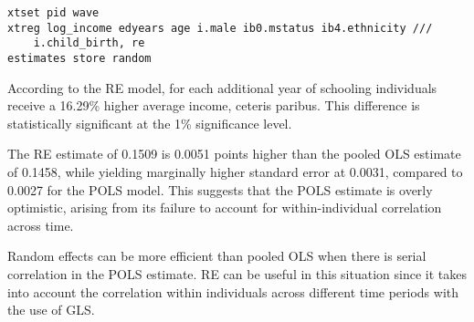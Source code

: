 


\begin{verbatim}
xtset pid wave
xtreg log_income edyears age i.male ib0.mstatus ib4.ethnicity ///
    i.child_birth, re
estimates store random
\end{verbatim}


According to the RE model, for each additional year of schooling individuals receive a 16.29\% higher average income, ceteris paribus. This difference is statistically significant at the 1\% significance level.

The RE estimate of 0.1509 is 0.0051 points higher than the pooled OLS estimate of 0.1458, while yielding marginally higher standard error at 0.0031, compared to 0.0027 for the POLS model. This suggests that the POLS estimate is overly optimistic, arising from its failure to account for within-individual correlation across time.


\newpage


Random effects can be more efficient than pooled OLS when there is serial correlation in the POLS estimate. RE can be useful in this situation since it takes into account the correlation within individuals across different time periods with the use of GLS.